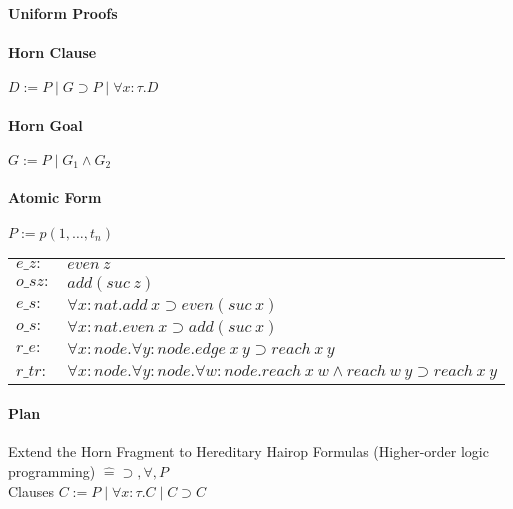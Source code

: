 \documentclass[12 pt]{article}
\begin{document}
       \paragraph{Uniform Proofs}
       \paragraph{Horn Clause} $D := P \mid G \supset P \mid \forall x
       : \tau . D$
       \paragraph{Horn Goal} $G := P \mid G_1 \land G_2$
       \paragraph{Atomic Form} $P := p(1, \ldots, t_n)$
       \\
       \begin{tabular}{l l}
         $e\_z:$&$even\ z$
         \\ $o\_sz:$ & $add(suc\ z)$
         \\ $e\_s:$ & $\forall x:nat. add \ x \supset even (suc\ x)$
         \\ $o\_s:$ & $\forall x : nat. even\ x \supset add(suc\ x)$
         \\ $r\_e:$ & $\forall x: node. \forall y:node . edge\ x\ y \supset reach\ x\ y$
         \\ $r\_tr:$ & $\forall x: node.\forall y: node. \forall w:node. reach\ x \ w \land reach\ w\ y \supset reach\ x \ y$
       \end{tabular}
       \paragraph{Plan} Extend the Horn Fragment to Hereditary Hairop
       Formulas (Higher-order logic programming) $\hat{=} \supset,
       \forall, P$
       \\ Clauses $C := P \mid \forall x : \tau.C \mid C \supset C$
\end{document}
